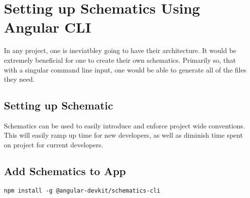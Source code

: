 \maketitle{}
\section{ Setting up Schematics Using Angular CLI }

In any project, one is ineviatbley going to have their architecture. It would
be extremely beneficial for one to create their own schematics. Primarily so,
that with a singular command line input, one would be able to generate all of
the files they need.

\subsection{ Setting up Schematic }

Schematics can be used to easily introduce and enforce project wide conventions.
This will easily ramp up time for new developers, as well as diminish time
spent on project for current developers.

\subsection{ Add Schematics to App }
\begin{lstlisting}
npm install -g @angular-devkit/schematics-cli
\end{lstlisting}
